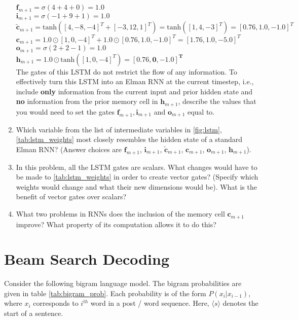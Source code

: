 \documentclass[12pt, letterpaper]{article}
\begin{document}
\begin{enumerate}
$\boldsymbol{f}_{m+1} = \sigma(4 + 4 + 0) = 1.0$ \\
\indent $\boldsymbol{i}_{m+1} = \sigma(-1 + 9 + 1) = 1.0$ \\
\indent $\boldsymbol{\tilde{c}}_{m+1} = \text{tanh}([4, -8, -4]^T + [-3, 12, 1]^T) = \text{tanh}([1,4,-3]^T) = [0.76, 1.0, -1.0]^T$\\
\indent $\boldsymbol{c}_{m+1} = 1.0 \odot [1,0,-4]^T + 1.0 \odot [0.76, 1.0, -1.0]^T = [1.76, 1.0, -5.0]^T $ \\
\indent $\boldsymbol{o}_{m+1} = \sigma(2 + 2 - 1) = 1.0$\\
\indent $\boldsymbol{h}_{m+1} = 1.0 \odot \text{tanh}([1,0,-4]^T) = \mathbf{[0.76, 0, -1.0]^T}$\\

The gates of this LSTM do not restrict the flow of any information. To effectively turn this LSTM into an Elman RNN at the current timestep, i.e., include \textbf{only} information from the current input and prior hidden state and \textbf{no} information from the prior memory cell in $\boldsymbol{h}_{m+1}$, describe the values that you would need to set the gates $\boldsymbol{f}_{m+1}, \boldsymbol{i}_{m+1}$ and $\boldsymbol{o}_{m+1}$ equal to.

\item Which variable from the list of intermediate variables in \autoref{fig:lstm}, \autoref{tab:lstm_weights} most closely resembles the hidden state of a standard Elman RNN? (Answer choices are $\boldsymbol{f}_{m+1}$, $\boldsymbol{i}_{m+1}$, $\boldsymbol{\tilde c}_{m+1}$, $\boldsymbol{c}_{m+1}$, $\boldsymbol{o}_{m+1}$, $\boldsymbol{h}_{m+1}$).

\item In this problem, all the LSTM gates are scalars. What changes would have to be made to \autoref{tab:lstm_weights} in order to create vector gates? (Specify which weights would change and what their new dimensions would be). What is the benefit of vector gates over scalars?

\item What two problems in RNNs does the inclusion of the memory cell $\boldsymbol{c}_{m+1}$ improve? What property of its computation allows it to do this?

\end{enumerate}


\section{Beam Search Decoding}
Consider the following bigram language model. The bigram probabilities are given in table \ref{tab:bigram_prob}. Each probability is of the form $P(x_i|x_{i-1})$, where $x_i$ corresponds to $i^{th}$ word in a post / word sequence. Here, $\langle s \rangle$ denotes the start of a sentence.
\end{document}

